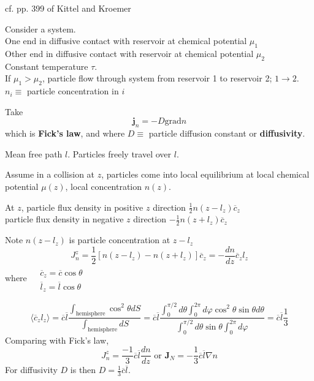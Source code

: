 cf. pp. 399 of Kittel and Kroemer \cite{CKittelHKroemer1980}

Consider a system.  \\
One end in diffusive contact with reservoir at chemical potential $\mu_1$ \\
Other end in diffusive contact with reservoir at chemical potential $\mu_2$ \\
Constant temperature $\tau$.  \\
If $\mu_1 > \mu_2$, particle flow through system from reservoir 1 to reservoir 2; $1\to 2$.   \\
$n_i \equiv $ particle concentration in $i$ 

Take
\begin{equation}
\mathbf{j}_n = -D \text{grad}n
\end{equation}
which is \textbf{Fick's law}, and where $D \equiv$ particle diffusion constant or \textbf{diffusivity}.  

Mean free path $l$.  Particles freely travel over $l$.  

Assume in a collision at $z$, particles come into local equilibrium at local chemical potential $\mu(z)$, local concentration $n(z)$.  

At $z$, particle flux density in positive $z$ direction \qquad $\frac{1}{2} n(z-l_z) \overline{c}_z$ \\
\phantom{At $z$, } particle flux density in negative $z$ direction \qquad $-\frac{1}{2} n(z+l_z) \overline{c}_z$

Note $n(z-l_z)$ is particle concentration at $z-l_z$
\[
J_n^z = \frac{1}{2} \left[ n(z-l_z) - n(z+l_z) \right] \overline{c}_z = -\frac{dn}{dz} \overline{c}_z l_z
\]
where $\begin{aligned} & \quad \\
  & \overline{c}_z = \overline{c} \cos{\theta}  \\
  & \overline{l}_z = \overline{l} \cos{\theta}  
\end{aligned}$

\[
\langle \overline{c}_z l_z \rangle = \overline{c} \overline{l} \frac{ \int_{\text{hemisphere} } \cos^2{\theta} dS }{ \int_{\text{hemisphere} } dS } = \overline{c}\overline{l} \frac{ \int_0^{\pi/2}d\theta \int_0^{2\pi } d\varphi \cos^2{\theta} \sin{\theta} d\theta }{ \int_0^{\pi/2} d\theta \sin{\theta} \int_0^{2\pi } d\varphi } = \overline{c} \overline{l} \frac{1}{3}
\]
Comparing with Fick's law, 
\[
J_n^z = \frac{-1}{3} \overline{c}\overline{l} \frac{dn}{dz} \text{ or } \mathbf{J}_N = -\frac{1}{3} \overline{c}\overline{l} \nabla n
\]
For diffusivity $D$ is then $D = \frac{1}{3} \overline{c}\overline{l}$.  

